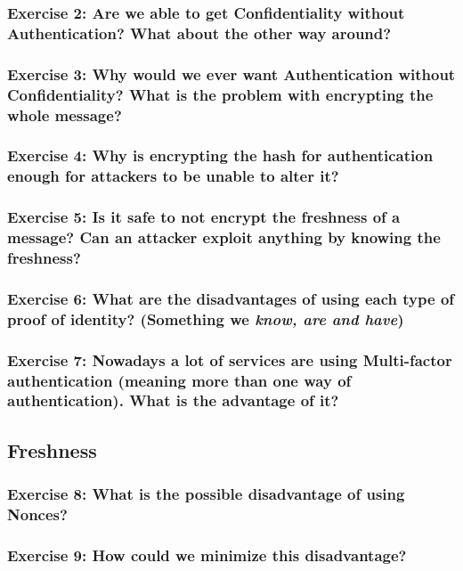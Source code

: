 \documentclass[12pt,a4paper]{article}
\theoremstyle{definition}
\begin{document}
\subsubsection*{Exercise 2: Are we able to get Confidentiality without Authentication? What about the other way around?}

\subsubsection*{Exercise 3: Why would we ever want Authentication without Confidentiality? What is the problem with encrypting the whole message?}

\subsubsection*{Exercise 4: Why is encrypting the hash for authentication enough for attackers to be unable to alter it?}

\subsubsection*{Exercise 5: Is it safe to not encrypt the freshness of a message? Can an attacker exploit anything by knowing the freshness? }

\subsubsection*{Exercise 6: What are the disadvantages of using each type of proof of identity? (Something we \emph{know, are and have})}

\subsubsection*{Exercise 7: Nowadays a lot of services are using Multi-factor authentication (meaning more than one way of authentication). What is the advantage of it?}

\subsection*{Freshness}
\subsubsection*{Exercise 8: What is the possible disadvantage of using Nonces?}

\subsubsection*{Exercise 9: How could we minimize this disadvantage?}
\end{document}
